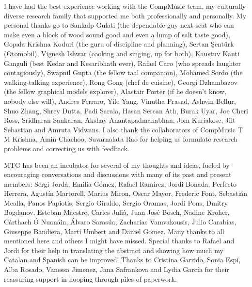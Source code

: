 I have had the best experience working with the CompMusic team, my culturally diverse research family that supported me both professionally and personally. My personal thanks go to Sankalp Gulati (the dependable guy next seat who can make even a block of wood sound good and even a lump of salt taste good), Gopala Krishna Koduri (the guru of discipline and planning), Sertan Şentürk (Otomobil), Vignesh Ishwar (cooking and singing, up for both), Kaustuv Kanti Ganguli (best Kedar and Kesaribhath ever), Rafael Caro (who spreads laughter contagiously), Swapnil Gupta (the fellow \gls{taal} companion), Mohamed Sordo (the walking-talking experience), Rong Gong (chef de cuisine), Georgi Dzhambazov (the fellow graphical models explorer), Alastair Porter (if he doesn't know, nobody else will), Andres Ferraro, Yile Yang, Vinutha Prasad, Ashwin Bellur, Shuo Zhang, Shrey Dutta, Padi Sarala, Hasan Sercan Atlı, Burak Uyar, Joe Cheri Ross, Sridharan Sankaran, Akshay Anantapadmanabhan, Jom Kuriakose, Jilt Sebastian and Amruta Vidwans. I also thank the collaborators of CompMusic T M Krishna, Amin Chachoo, Suvarnalata Rao for helping us formulate research problems and correcting us with feedback. 

MTG has been an incubator for several of my thoughts and ideas, fueled by encouraging conversations and discussions with many of its past and present members: Sergi Jordà, Emilia Gómez, Rafael Ramírez, Jordi Bonada, Perfecto Herrera, Agustín Martorell, Marius Miron, Oscar Mayor, Frederic Font, Sebastián Mealla, Panos Papiotis, Sergio Giraldo, Sergio Oramas, Jordi Pons, Dmitry Bogdanov, Esteban Maestre, Carles Julià, Juan José Bosch, Nadine Kroher, Cárthach Ó Nuanáin, Álvaro Sarasúa, Zacharias Vamvakousis, Julio Carabias, Giuseppe Bandiera, Martí Umbert and Daniel Gomez. Many thanks to all mentioned here and others I might have missed. Special thanks to Rafael and Jordi for their help in translating the abstract and showing how much my Catalan and Spanish can be improved! Thanks to Cristina Garrido, Sonia Espí, Alba Rosado, Vanessa Jimenez, Jana Safrankova and Lydia García for their reassuring support in hooping through piles of paperwork. 


